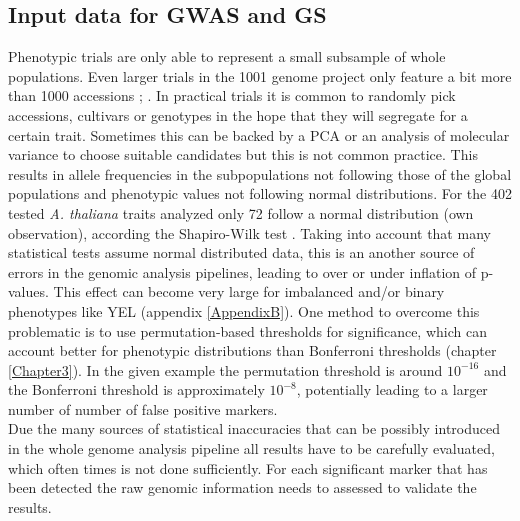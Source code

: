 \subsection{Input data for GWAS and GS}

Phenotypic trials are only able to represent a small subsample of whole populations. Even
larger trials in the 1001 genome project only feature a bit more than 1000 accessions
\cite{atwell2010}; \cite{1001genome}. In practical trials it is common to randomly pick
accessions, cultivars or genotypes in the hope that they will segregate for a certain
trait. Sometimes this can be backed by a PCA or an analysis of molecular variance to
choose suitable candidates \cite{holker2019european} but this is not common practice. This
results in allele frequencies in the subpopulations not following those of the global
populations and phenotypic values not following normal distributions. For the 402 tested
\textit{A. thaliana} traits analyzed only 72 follow a normal distribution (own
observation), according the Shapiro-Wilk test \cite{shapiro1965analysis}. Taking into
account that many statistical tests assume normal distributed data, this is an another
source of errors in the genomic analysis pipelines, leading to over or under inflation of
p-values. This effect can become very large for imbalanced and/or binary phenotypes like
YEL (appendix \ref{AppendixB}). One method to overcome this problematic is to use
permutation-based thresholds for significance, which can account better for phenotypic
distributions than Bonferroni thresholds (chapter \ref{Chapter3}). In the given example
the permutation threshold is around $10^{-16}$ and the Bonferroni threshold is
approximately $10^{-8 }$, potentially leading to a larger number of number of false
positive markers.\\
Due the many sources of statistical inaccuracies that can be possibly introduced in the
whole genome analysis pipeline all results have to be carefully evaluated, which often
times is not done sufficiently. For each significant marker that has been detected the raw
genomic information needs to assessed to validate the results.


